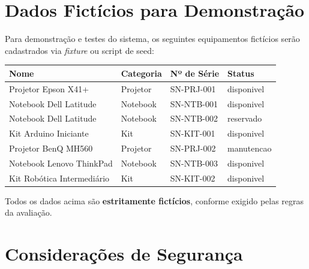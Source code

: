 \documentclass[12pt, a4paper]{article}
\begin{document}
\section{Dados Fictícios para Demonstração}

Para demonstração e testes do sistema, os seguintes equipamentos fictícios serão
cadastrados via \textit{fixture} ou script de seed:

\begin{center}
\begin{tabular}{llll}
  \toprule
  \textbf{Nome}              & \textbf{Categoria} & \textbf{Nº de Série} & \textbf{Status} \\
  \midrule
  Projetor Epson X41+        & Projetor           & SN-PRJ-001           & disponivel \\
  Notebook Dell Latitude     & Notebook           & SN-NTB-001           & disponivel \\
  Notebook Dell Latitude     & Notebook           & SN-NTB-002           & reservado  \\
  Kit Arduino Iniciante      & Kit                & SN-KIT-001           & disponivel \\
  Projetor BenQ MH560        & Projetor           & SN-PRJ-002           & manutencao \\
  Notebook Lenovo ThinkPad   & Notebook           & SN-NTB-003           & disponivel \\
  Kit Robótica Intermediário & Kit                & SN-KIT-002           & disponivel \\
  \bottomrule
\end{tabular}
\end{center}

Todos os dados acima são \textbf{estritamente fictícios}, conforme exigido pelas
regras da avaliação.

\section{Considerações de Segurança}
\end{document}
